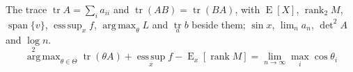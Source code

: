 \documentclass{article}
\DeclareMathOperator{\tr}{tr}
\DeclareMathOperator*{\argmax}{arg\,max}
\DeclareMathOperator{\E}{E}
\DeclareMathOperator{\rank}{rank}
\begin{document}
The trace $\tr A = \sum_i a_{ii}$ and $\tr(AB)=\tr(BA)$, with $\E[X]$, $\rank_2 M$, $\operatorname{span}\{v\}$, $\operatorname*{ess\,sup}_x f$, $\argmax_{\theta} L$ and $\tr\limits_a b$ beside them; $\sin x$, $\lim_{n} a_n$, $\det^2 A$ and $\log\limits_2 n$.
\[ \argmax_{\theta\in\Theta} \tr\left(\theta A\right) + \operatorname*{ess\,sup}_{x} f - \E_{x}[\rank M] = \lim_{n\to\infty} \max_{i} \cos\theta_i \]
\end{document}
